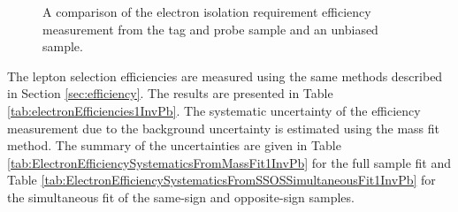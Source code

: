 \documentclass{cmspaper}
\begin{document}
\begin{figure}[htb]
  \begin{center}
    \caption{A comparison of the electron isolation requirement efficiency measurement from the tag and probe sample and an unbiased \Z\To\Ep\Em sample.}
    \label{eleIsoCutEfficiency_Efficiency_ComparisonTagAndProbeVsUnbiased}
  \end{center}
\end{figure}

The lepton selection efficiencies are measured using the same methods described in Section \ref{sec:efficiency}. The results are presented in Table \ref{tab:electronEfficiencies1InvPb}. The systematic uncertainty of the efficiency measurement due to the background uncertainty is estimated using the mass fit method. The summary of the uncertainties are given in Table \ref{tab:ElectronEfficiencySystematicsFromMassFit1InvPb} for the full sample fit and Table \ref{tab:ElectronEfficiencySystematicsFromSSOSSimultaneousFit1InvPb} for the simultaneous fit of the same-sign and opposite-sign samples.
\end{document}
